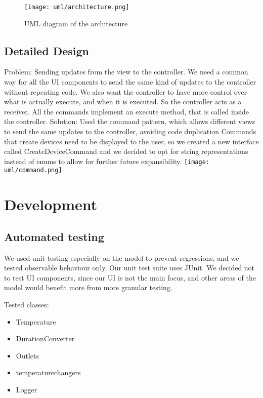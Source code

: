 \documentclass[a4paper,12pt]{report}
\begin{document}
\begin{figure}[H]
\centering{}
\texttt{[image: uml/architecture.png]}
\caption{UML diagram of the architecture}
\label{uml:architecture}
\end{figure}

\section{Detailed Design}
Problem: Sending updates from the view to the controller. 
We need a common way for all the UI components to send the same kind of updates to the controller without repeating code.
We also want the controller to have more control over what is actually execute, and when it is executed. So the controller acts as a receiver.
All the commands implement an execute method, that is called inside the controller.
Solution: Used the command pattern, which allows 
different views to send the same updates to the controller, avoiding code duplication
Commands that create devices need to be displayed to the user, so we created a new interface called CreateDeviceCommand
and we decided to opt for string representations instead of enums to allow for further future expansibility.
\newline
\texttt{[image: uml/command.png]}






\chapter{Development}
\section{Automated testing}
We used unit testing especially on the model to prevent regressions, and we tested observable behaviour only.
Our unit test suite uses JUnit.
We decided not to test UI components, since our UI is not the main focus,
and other areas of the model would benefit more from more granular testing. 

Tested classes:
\begin{itemize}
	\item Temperature
	\item DurationConverter
	\item Outlets
	\item temperaturechangers
	\item Logger
\end{itemize}
\end{document}
